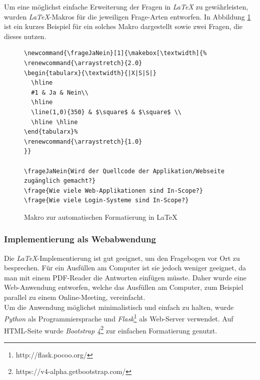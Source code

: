 Um eine möglichst einfache Erweiterung der Fragen in \textit{LaTeX} zu gewährleisten, wurden \textit{LaTeX}-Makros für die jeweiligen Frage-Arten entworfen. In Abbildung \ref{lst:PenProzVorbAutFormat} ist ein kurzes Beispiel für ein solches Makro dargestellt sowie zwei Fragen, die dieses nutzen.

\begin{figure}
\lstset{language=Tex}
\begin{lstlisting}
\newcommand{\frageJaNein}[1]{\makebox[\textwidth]{%
\renewcommand{\arraystretch}{2.0}
\begin{tabularx}{\textwidth}{|X|S|S|}
  \hline
  #1 & Ja & Nein\\
  \hline
  \line(1,0){350} & $\square$ & $\square$ \\
  \hline \hline
\end{tabularx}%
\renewcommand{\arraystretch}{1.0}
}}

\frageJaNein{Wird der Quellcode der Applikation/Webseite zugänglich gemacht?}
\frage{Wie viele Web-Applikationen sind In-Scope?}
\frage{Wie viele Login-Systeme sind In-Scope?}
\end{lstlisting}
\caption{Makro zur automatischen Formatierung in LaTeX}
\label{lst:PenProzVorbAutFormat}
\end{figure}

\subsubsection{Implementierung als Webabwendung}\label{ref:AufImplInWeb}
Die \textit{LaTeX}-Implementierung ist gut geeignet, um den Fragebogen vor Ort zu besprechen. Für ein Ausfüllen am Computer ist sie jedoch weniger geeignet, da man mit einem  PDF-Reader die Antworten einfügen müsste. Daher wurde eine Web-Anwendung entworfen, welche das Ausfüllen am Computer, zum Beispiel parallel zu einem Online-Meeting, vereinfacht.\\

\newpage
Um die Anwendung möglichst minimalistisch und einfach zu halten, wurde \textit{Python} als Programmiersprache und \textit{Flask}\footnote{http://flask.pocoo.org/} als Web-Server verwendet. Auf HTML-Seite wurde \textit{Bootstrap 4}\footnote{https://v4-alpha.getbootstrap.com/} zur einfachen Formatierung genutzt.\\

